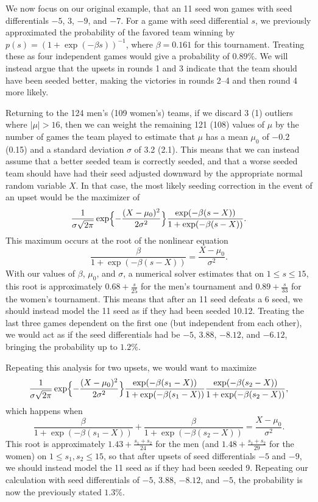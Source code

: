 \documentclass{article}
\begin{document}
We now focus on our original example, that an 11 seed won games with seed differentials $-5$, $3$, $-9$, and $-7$.  For a game with seed differential $s$, we previously approximated the probability of the favored team winning by $p(s)=(1+\exp(-\beta s))^{-1}$, where $\beta=0.161$ for this tournament.  Treating these as four independent games would give a probability of $0.89\%$. We will instead argue that the upsets in rounds 1 and 3 indicate that the team should have been seeded better, making the victories in rounds 2--4 and then round 4 more likely.

Returning to the 124 men's (109 women's) teams, if we discard 3 (1) outliers where $\lvert\mu\rvert>16$, then we can weight the remaining 121 (108) values of $\mu$ by the number of games the team played to estimate that $\mu$ has a mean $\mu_0$  of $-0.2$ (0.15) and a standard deviation $\sigma$  of 3.2 (2.1). This means that we can instead assume that a better seeded team is correctly seeded, and that a worse seeded team should have had their seed adjusted downward by the appropriate normal random variable $X$.  In that case, the most likely seeding correction in the event of an upset would be the maximizer of
\[\frac1{\sigma\sqrt{2\pi}}\exp\Bigl\{-\frac{(X-\mu_0)^2}{2\sigma^2}\Bigr\}\frac{\exp(-\beta(s-X))}{1+\exp(-\beta(s-X))}.\]
This maximum occurs at the root of the nonlinear equation
\[\frac\beta{1+\exp(-\beta(s-X))}=\frac{X-\mu_0}{\sigma^2}.\]
With our values of $\beta$, $\mu_0$, and $\sigma$, a numerical solver estimates that on $1\le s\le15$, this root is approximately $0.68+\frac s{25}$ for the men's tournament and $0.89+\frac s{33}$ for the women's tournament.  This means that after an 11 seed defeats a 6 seed, we should instead model the 11 seed as if they had been seeded 10.12.  Treating the last three games dependent on the first one (but independent from each other), we would act as if the seed differentials had be $-5$, $3.88$, $-8.12$, and $-6.12$, bringing the probability up to $1.2\%$.

Repeating this analysis for two upsets, we would want to maximize
\[
\frac1{\sigma\sqrt{2\pi}}\exp\Bigl\{-\frac{(X-\mu_0)^2}{2\sigma^2}\Bigr\}
\frac{\exp(-\beta(s_1-X))}{1+\exp(-\beta(s_1-X))}
\frac{\exp(-\beta(s_2-X))}{1+\exp(-\beta(s_2-X))},
\]
which happens when
\[\frac\beta{1+\exp(-\beta(s_1-X))}+\frac\beta{1+\exp(-\beta(s_2-X))}=\frac{X-\mu_0}{\sigma^2}.\]
This root is approximately $1.43+\frac{s_1+s_2}{24}$ for the men (and $1.48+\frac{s_1+s_2}{29}$ for the women) on $1\le s_1,s_2\le15$, so that after upsets of seed differentials $-5$ and $-9$, we should instead model the 11 seed as if they had been seeded 9.  Repeating our calculation with seed differentials of $-5$, $3.88$, $-8.12$, and $-5$, the probability is now the previously stated $1.3\%$.
\end{document}
